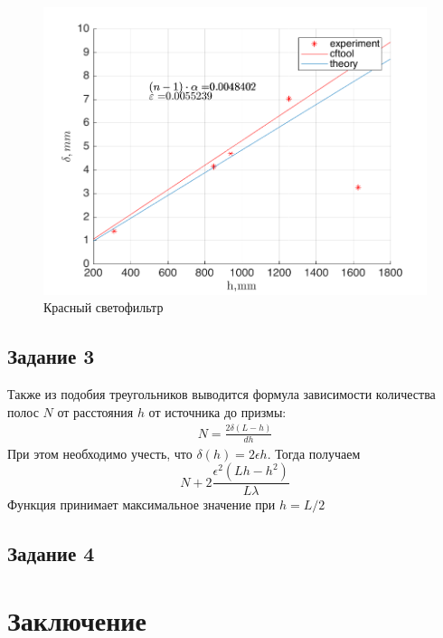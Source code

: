 \begin{figure}[]
	\centering
	\includegraphics[width=\textwidth]{data/d_r.png}
	\caption{Красный светофильтр}
	\label{fig:d_r}
\end{figure}
\subsection{Задание 3}
Также из подобия треугольников выводится формула зависимости количества полос $N$ от расстояния $h$ от источника до призмы:
\begin{gather}
	N=\frac{2\delta(L-h)}{dh} \nonumber
\end{gather}
При этом необходимо учесть, что $\delta(h)=2\epsilon h$. Тогда получаем 
\begin{equation}
	N+2\frac{\epsilon^2(Lh-h^2)}{L\lambda}
\end{equation}
Функция принимает максимальное значение при $h=L/2$


\subsection{Задание 4}






\section{Заключение}

 